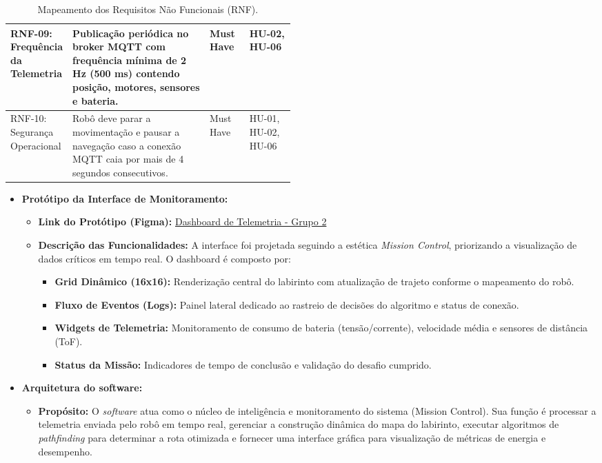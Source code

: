 \begin{table}[H]
\begin{tabularx}{\linewidth}{|>{\raggedright\arraybackslash}p{0.18\linewidth}|X|>{\centering\arraybackslash}p{0.14\linewidth}|>{\centering\arraybackslash}p{0.16\linewidth}|}
        RNF-09: Frequência da Telemetria & Publicação periódica no broker MQTT com frequência mínima de 2 Hz (500 ms) contendo posição, motores, sensores e bateria. & Must Have & HU-02, HU-06 \\ \hline
        
        RNF-10: Segurança Operacional & Robô deve parar a movimentação e pausar a navegação caso a conexão MQTT caia por mais de 4 segundos consecutivos. & Must Have & HU-01, HU-02, HU-06 \\ \hline
    \end{tabularx}
    \caption{Mapeamento dos Requisitos Não Funcionais (RNF).}
    \label{tab:requisitos_nao_funcionais}
\end{table}

\begin{itemize}
    \item \textbf{Protótipo da Interface de Monitoramento:}
        \begin{itemize}
            \item \textbf{Link do Protótipo (Figma):} \href{https://www.figma.com/design/XJGha6pemQS4kD2XydKeLr/Robozin?m=auto&t=tc0JBodUJ4Lv3OWG-6}{Dashboard de Telemetria - Grupo 2}
            \item \textbf{Descrição das Funcionalidades:} 
            A interface foi projetada seguindo a estética \textit{Mission Control}, priorizando a visualização de dados críticos em tempo real. O dashboard é composto por:
            \begin{itemize}
                \item \textbf{Grid Dinâmico (16x16):} Renderização central do labirinto com atualização de trajeto conforme o mapeamento do robô.
                \item \textbf{Fluxo de Eventos (Logs):} Painel lateral dedicado ao rastreio de decisões do algoritmo e status de conexão.
                \item \textbf{Widgets de Telemetria:} Monitoramento de consumo de bateria (tensão/corrente), velocidade média e sensores de distância (ToF).
                \item \textbf{Status da Missão:} Indicadores de tempo de conclusão e validação do desafio cumprido.
            \end{itemize}
        \end{itemize}

    \item \textbf{Arquitetura do software:}
    \begin{itemize}
        \item \textbf{Propósito:}
        O \textit{software} atua como o núcleo de inteligência e monitoramento do sistema (Mission Control). Sua função é processar a telemetria enviada pelo robô em tempo real, gerenciar a construção dinâmica do mapa do labirinto, executar algoritmos de \textit{pathfinding} para determinar a rota otimizada e fornecer uma interface gráfica para visualização de métricas de energia e desempenho.
    

\end{itemize}
\end{itemize}
